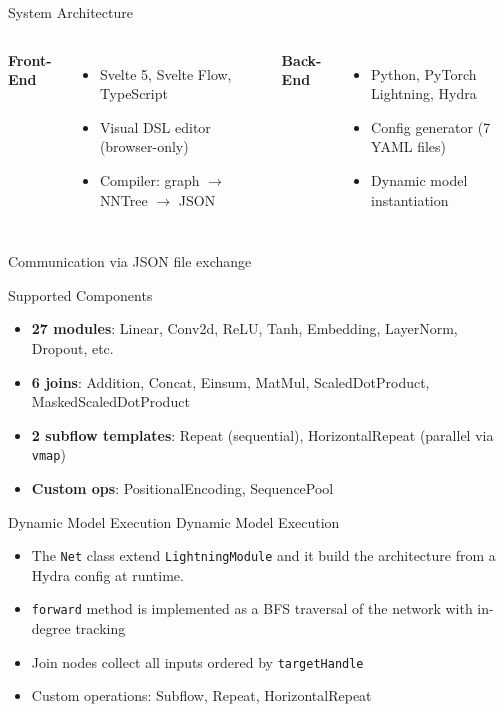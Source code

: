 \documentclass[11pt]{beamer}
\begin{document}
\begin{frame}{System Architecture}
	\begin{columns}[t]
		\textbf{Front-End}
		\begin{itemize}
			\item Svelte 5, Svelte Flow, TypeScript
			\item Visual DSL editor (browser-only)
			\item Compiler: graph $\rightarrow$ NNTree $\rightarrow$ JSON
		\end{itemize}

		\textbf{Back-End}
		\begin{itemize}
			\item Python, PyTorch Lightning, Hydra
			\item Config generator (7 YAML files)
			\item Dynamic model instantiation
		\end{itemize}
	\end{columns}

	\vspace{10pt}
	Communication via JSON file exchange
\end{frame}

\begin{frame}{Supported Components}
	\begin{itemize}
		\item \textbf{27 modules}: Linear, Conv2d, ReLU, Tanh, Embedding, LayerNorm, Dropout, etc.
		\item \textbf{6 joins}: Addition, Concat, Einsum, MatMul, ScaledDotProduct, MaskedScaledDotProduct
		\item \textbf{2 subflow templates}: Repeat (sequential), HorizontalRepeat (parallel via \texttt{vmap})
		\item \textbf{Custom ops}: PositionalEncoding, SequencePool
	\end{itemize}
\end{frame}

\begin{frame}{Dynamic Model Execution}
	\alert{Dynamic Model Execution}
	\begin{itemize}
		\item The \texttt{Net} class extend \texttt{LightningModule} and it build the architecture from a Hydra config at runtime.
		\item \texttt{forward} method is implemented as a \alert{BFS traversal of the network with in-degree tracking}
		\item Join nodes collect all inputs ordered by \texttt{targetHandle}
		\item Custom operations: Subflow, Repeat, HorizontalRepeat
	\end{itemize}
	\vspace{10pt}
\end{frame}
\end{document}
